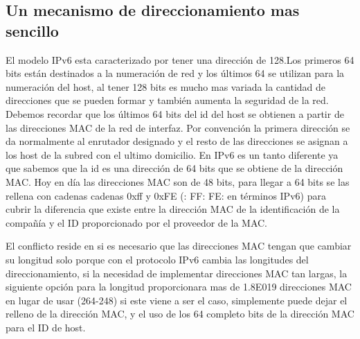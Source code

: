 \documentclass[11pt,a4paper]{article}
\begin{document}
\subsection{Un mecanismo de direccionamiento  mas sencillo}
El modelo IPv6 esta  caracterizado por tener  una dirección de 128.Los primeros 64 bits están 
destinados a la numeración de red y los últimos 64 se utilizan para la numeración del host, al tener 
128 bits es mucho mas variada la cantidad de direcciones que se pueden formar y también aumenta la 
seguridad de la red. Debemos recordar que los últimos 64 bits del id del host se obtienen a partir 
de las direcciones MAC de la red de interfaz. Por convención la primera dirección se da normalmente 
al enrutador designado y el resto de las direcciones se asignan a los host de la subred con el 
ultimo domicilio. En IPv6 es un tanto diferente ya que  sabemos que la id es una dirección  de 64 
bits que se obtiene de la dirección MAC. Hoy en día las direcciones MAC son de 48 bits, para llegar 
a 64 bits se las rellena con cadenas cadenas 0xff y 0xFE (: FF: FE: en términos IPv6) para cubrir la 
diferencia que existe entre la dirección MAC de la identificación de la compañía y el ID 
proporcionado por el proveedor de la MAC.\par
El conflicto reside en si es necesario que las direcciones MAC tengan que cambiar su longitud  solo 
porque con el protocolo IPv6 cambia las longitudes del direccionamiento, si la necesidad de 
implementar direcciones MAC tan largas, la siguiente opción para la longitud proporcionara mas de 
1.8E019 direcciones MAC en lugar de usar (264-248) si este viene a ser el
caso, simplemente puede dejar el relleno de la dirección MAC, y el uso de los 64 completo
bits de la dirección MAC para el ID de host.
\end{document}
